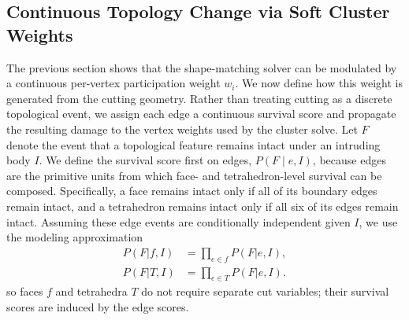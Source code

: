 \documentclass[letterpaper, 10 pt, conference]{ieeeconf}  %
\theoremstyle{tight}
\begin{document}


\subsection{Continuous Topology Change via Soft Cluster Weights}
\label{sec:pf-cutting}

The previous section shows that the shape-matching solver can be modulated by
a continuous per-vertex participation weight $w_i$. We now define how this
weight is generated from the cutting geometry. Rather than treating cutting as
a discrete topological event, we assign each edge a continuous survival score
and propagate the resulting damage to the vertex weights used by the cluster
solve. Let $F$ denote the event that a topological feature remains intact under an
intruding body $I$. We define the survival score first on edges,
$P(F\mid e,I)$, because edges are the primitive units from which face- and
tetrahedron-level survival can be composed. Specifically, a face remains intact
only if all of its boundary edges remain intact, and a tetrahedron remains
intact only if all six of its edges remain intact. Assuming these edge events
are conditionally independent given $I$, we use the modeling approximation
\begin{equation}
\begin{aligned}
  P(F|f,I) &= \prod_{e\in f} P(F|e,I), \\
  P(F|T,I) &= \prod_{e\in T} P(F|e,I).
\end{aligned}
\label{eq:simplicial-product}
\end{equation}
so faces $f$ and tetrahedra $T$ do not require separate cut variables; their
survival scores are induced by the edge scores.
\end{document}
